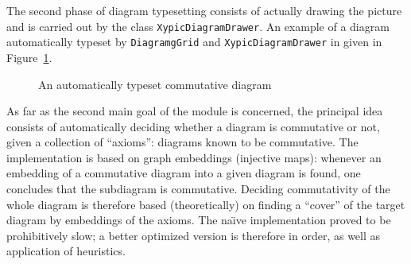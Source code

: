 The second phase of diagram typesetting consists of actually drawing the picture
and is carried out by the class \texttt{XypicDiagramDrawer}.  An example of a
diagram automatically typeset by \texttt{DiagramgGrid} and
\texttt{XypicDiagramDrawer} in given in Figure~\ref{fig:cat:loops}.
\begin{figure}[h]
  \centerline{
  }
  \caption{An automatically typeset commutative diagram}\label{fig:cat:loops}
\end{figure}

As far as the second main goal of the module is concerned, the principal idea
consists of automatically deciding whether a diagram is commutative or not,
given a collection of ``axioms'': diagrams known to be commutative. The
implementation is based on graph embeddings (injective maps): whenever an
embedding of a commutative diagram into a given diagram is found, one
concludes that the subdiagram is commutative. Deciding commutativity of the
whole diagram is therefore based (theoretically) on finding a ``cover'' of the
target diagram by embeddings of the axioms. The na\"{\i}ve implementation
proved to be prohibitively slow; a better optimized version is therefore in
order, as well as application of heuristics.
